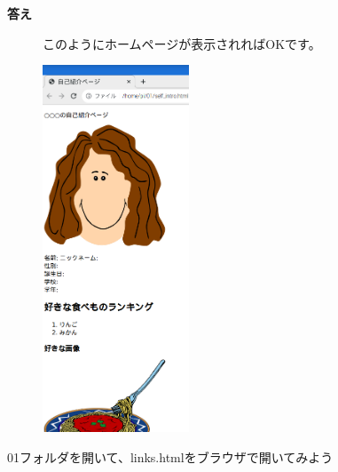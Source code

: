 \documentclass[a4paper,12pt]{jarticle}
\begin{document}
\bigskip

\clearpage
\textbf{答え}



\begin{figure}[hb]
  \centering
  \begin{minipage}{16.574cm}
    このようにホームページが表示されればOKです。

    \centering
    \includegraphics[height=10.933cm]{textbook-img142.png}
  \end{minipage}

\end{figure}
\theQuestion\label{Q:hasAnswer04-1}

01フォルダを開いて、links.htmlをブラウザで開いてみよう


\bigskip

\vfill
\end{document}
